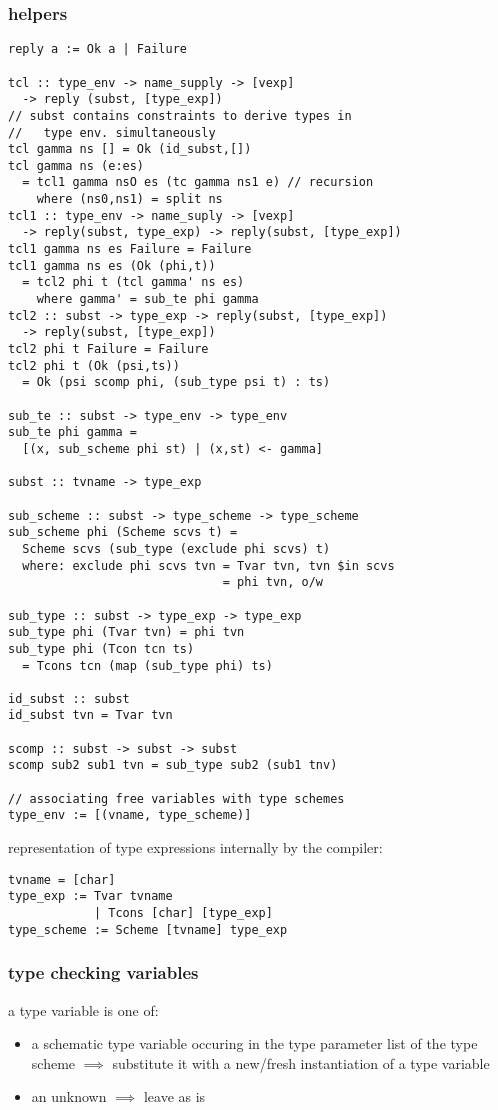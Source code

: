 \documentclass[8pt]{extarticle}
\begin{document}
\begin{multicols*}{2}
\subsubsection{helpers}
\begin{verbatim}
reply a := Ok a | Failure

tcl :: type_env -> name_supply -> [vexp]
  -> reply (subst, [type_exp])
// subst contains constraints to derive types in
//   type env. simultaneously
tcl gamma ns [] = Ok (id_subst,[])
tcl gamma ns (e:es)
  = tcl1 gamma nsO es (tc gamma ns1 e) // recursion
    where (ns0,ns1) = split ns
tcl1 :: type_env -> name_suply -> [vexp]
  -> reply(subst, type_exp) -> reply(subst, [type_exp])
tcl1 gamma ns es Failure = Failure
tcl1 gamma ns es (Ok (phi,t))
  = tcl2 phi t (tcl gamma' ns es)
    where gamma' = sub_te phi gamma
tcl2 :: subst -> type_exp -> reply(subst, [type_exp])
  -> reply(subst, [type_exp])
tcl2 phi t Failure = Failure
tcl2 phi t (Ok (psi,ts))
  = Ok (psi scomp phi, (sub_type psi t) : ts)

sub_te :: subst -> type_env -> type_env
sub_te phi gamma =
  [(x, sub_scheme phi st) | (x,st) <- gamma]

subst :: tvname -> type_exp

sub_scheme :: subst -> type_scheme -> type_scheme
sub_scheme phi (Scheme scvs t) =
  Scheme scvs (sub_type (exclude phi scvs) t)
  where: exclude phi scvs tvn = Tvar tvn, tvn $in scvs
                              = phi tvn, o/w

sub_type :: subst -> type_exp -> type_exp
sub_type phi (Tvar tvn) = phi tvn
sub_type phi (Tcon tcn ts)
  = Tcons tcn (map (sub_type phi) ts)

id_subst :: subst
id_subst tvn = Tvar tvn

scomp :: subst -> subst -> subst
scomp sub2 sub1 tvn = sub_type sub2 (sub1 tnv)

// associating free variables with type schemes
type_env := [(vname, type_scheme)]
\end{verbatim} 

representation of type expressions internally by the compiler:
\begin{verbatim}
tvname = [char]
type_exp := Tvar tvname
            | Tcons [char] [type_exp]
type_scheme := Scheme [tvname] type_exp
\end{verbatim}

\subsubsection{type checking variables}
a type variable is one of:
\begin{itemize}
\item a schematic type variable occuring in the type parameter list of the type scheme $\implies$ substitute it with a new/fresh instantiation of a type variable
\item an unknown $\implies$ leave as is
\end{itemize}


\end{multicols*}
\end{document}
